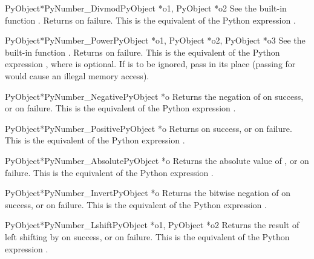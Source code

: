 \documentclass{manual}
\begin{document}
\begin{cfuncdesc}{PyObject*}{PyNumber_Divmod}{PyObject *o1, PyObject *o2}
See the built-in function .
Returns \NULL{} on failure.  This is the equivalent of the Python
expression .
\end{cfuncdesc}


\begin{cfuncdesc}{PyObject*}{PyNumber_Power}{PyObject *o1, PyObject *o2, PyObject *o3}
See the built-in function .  Returns
\NULL{} on failure. This is the equivalent of the Python expression
, where  is optional.
If  is to be ignored, pass  in its place
(passing \NULL{} for  would cause an illegal memory access).
\end{cfuncdesc}


\begin{cfuncdesc}{PyObject*}{PyNumber_Negative}{PyObject *o}
Returns the negation of  on success, or \NULL{} on failure.
This is the equivalent of the Python expression .
\end{cfuncdesc}


\begin{cfuncdesc}{PyObject*}{PyNumber_Positive}{PyObject *o}
Returns  on success, or \NULL{} on failure.
This is the equivalent of the Python expression .
\end{cfuncdesc}


\begin{cfuncdesc}{PyObject*}{PyNumber_Absolute}{PyObject *o}
Returns the absolute value of , or \NULL{} on failure.  This is
the equivalent of the Python expression .
\end{cfuncdesc}


\begin{cfuncdesc}{PyObject*}{PyNumber_Invert}{PyObject *o}
Returns the bitwise negation of  on success, or \NULL{} on
failure.  This is the equivalent of the Python expression
.
\end{cfuncdesc}


\begin{cfuncdesc}{PyObject*}{PyNumber_Lshift}{PyObject *o1, PyObject *o2}
Returns the result of left shifting  by  on success,
or \NULL{} on failure.  This is the equivalent of the Python
expression .
\end{cfuncdesc}
\end{document}

